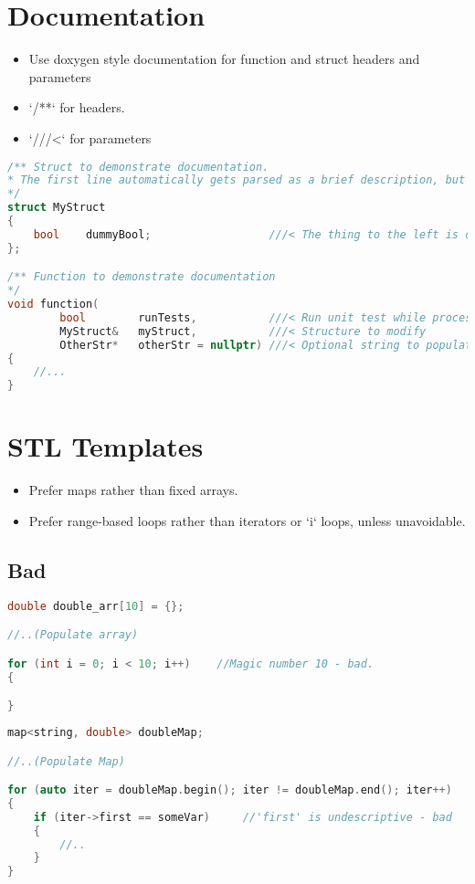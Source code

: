\section{Documentation}
\begin{itemize}
\item Use doxygen style documentation for function and struct headers and parameters
\item `/**`  for headers.
\item `///<` for parameters
\end{itemize}
\begin{lstlisting}[language=c++]
/** Struct to demonstrate documentation.
* The first line automatically gets parsed as a brief description, but more detailed descriptions are possible too.
*/
struct MyStruct
{
    bool    dummyBool;                  ///< The thing to the left is documented here
};

/** Function to demonstrate documentation
*/
void function(
        bool        runTests,           ///< Run unit test while processing
        MyStruct&   myStruct,           ///< Structure to modify
        OtherStr*	otherStr = nullptr)	///< Optional string to populate
{
   	//...
}
\end{lstlisting}

\section{STL Templates}
\begin{itemize}
\item Prefer maps rather than fixed arrays.
\item Prefer range-based loops rather than iterators or `i` loops, unless unavoidable.
\end{itemize}

\subsection{Bad}
\begin{lstlisting}[language=c++]
double double_arr[10] = {};

//..(Populate array)

for (int i = 0; i < 10; i++)    //Magic number 10 - bad.
{

}
\end{lstlisting}
%
\begin{lstlisting}[language=c++]
map<string, double> doubleMap;

//..(Populate Map)

for (auto iter = doubleMap.begin(); iter != doubleMap.end(); iter++)   //long, undescriptive - bad
{
   	if (iter->first == someVar)     //'first' is undescriptive - bad
   	{
   		//..
   	}
}
\end{lstlisting}
